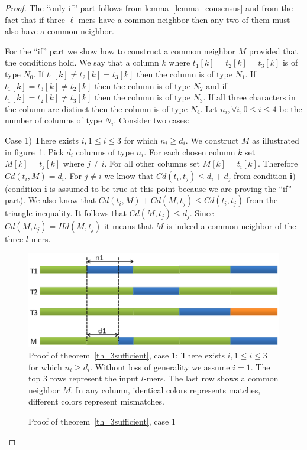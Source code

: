 \begin{proof}
The ``only if'' part follows from lemma~\ref{lemma_consensus} and from the fact
that if three $\ell$-mers have a common neighbor then any two of them must also
have a common neighbor.

For the ``if'' part we show how to
construct a common neighbor $M$ provided that the conditions hold.
We say that a column $k$ where
$t_1[k]=t_2[k]=t_3[k]$ is of type $N_0$. If $t_1[k]\neq t_2[k] = t_3[k]$ then
the column is of type $N_1$. If $t_1[k]=t_3[k]\neq t_2[k]$ then the
column is of type $N_2$ and if $t_1[k]=t_2[k]\neq t_3[k]$ then the column is of
type $N_3$. If all three characters in the column are distinct then the
column is of type $N_4$. Let $n_i, \forall i, 0\leq i \leq 4$ be
the number of columns of type $N_i$. Consider two cases:

Case 1) There exists $i, 1 \leq i \leq 3$ for which $n_i \geq d_i$. We construct
$M$ as illustrated in figure~\ref{figProofCase1}. Pick $d_i$ columns of type
$n_i$. For each chosen column $k$ set $M[k]=t_j[k]$ where $j\neq i$. For all
other columns  set $M[k]=t_i[k]$. Therefore $Cd(t_i, M) = d_i$.
For $j\neq i$ we know that $Cd(t_i,t_j)
\leq d_i+d_j$ from condition $\textbf{i)}$ (condition $\textbf{i}$ is assumed to be
true at this point because we are proving the ``if'' part).
We also know that $Cd(t_i,M)+Cd(M,t_j)\leq Cd(t_i,t_j)$ from the triangle
inequality.
It follows that $Cd(M,t_j)\leq d_j$. Since $Cd(M,t_j)=Hd(M,t_j)$ it means that
$M$ is indeed a common neighbor of the three $l$-mers.

\begin{figure}[!h]
\caption{Proof of theorem~\ref{th_3sufficient},  case 1}\label{figProofCase1}
\includegraphics[width=\linewidth]{proof-case1}
Proof of theorem~\ref{th_3sufficient},  case 1:  There exists $i, 1 \leq i \leq 3$ for which $n_i\geq d_i$.
Without loss of generality we assume $i=1$.
The top 3 rows represent the input $l$-mers. The last row shows a common neighbor $M$. In any
column, identical colors represents matches, different colors represent mismatches.
\end{figure}


\end{proof}
